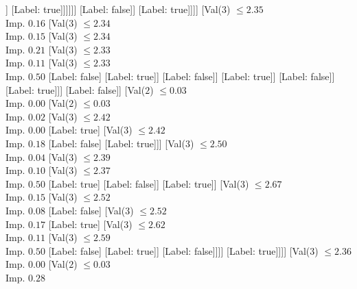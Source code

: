\documentclass[margin=10pt]{standalone}
\begin{document}
\begin{forest}
																										]
																									[Label: true]]]]]]
																				[Label: false]]
																			[Label: true]]]]
																[Val($3$) $ \leq 2.35$ \\ Imp. $0.16$
																	[Val($3$) $ \leq 2.34$ \\ Imp. $0.15$
																		[Val($3$) $ \leq 2.34$ \\ Imp. $0.21$
																			[Val($3$) $ \leq 2.33$ \\ Imp. $0.11$
																				[Val($3$) $ \leq 2.33$ \\ Imp. $0.50$
																					[Label: false]
																					[Label: true]]
																				[Label: false]]
																			[Label: true]]
																		[Label: false]]
																	[Label: true]]]
															[Label: false]]
														[Val($2$) $ \leq 0.03$ \\ Imp. $0.00$
															[Val($2$) $ \leq 0.03$ \\ Imp. $0.02$
																[Val($3$) $ \leq 2.42$ \\ Imp. $0.00$
																	[Label: true]
																	[Val($3$) $ \leq 2.42$ \\ Imp. $0.18$
																		[Label: false]
																		[Label: true]]]
																[Val($3$) $ \leq 2.50$ \\ Imp. $0.04$
																	[Val($3$) $ \leq 2.39$ \\ Imp. $0.10$
																		[Val($3$) $ \leq 2.37$ \\ Imp. $0.50$
																			[Label: true]
																			[Label: false]]
																		[Label: true]]
																	[Val($3$) $ \leq 2.67$ \\ Imp. $0.15$
																		[Val($3$) $ \leq 2.52$ \\ Imp. $0.08$
																			[Label: false]
																			[Val($3$) $ \leq 2.52$ \\ Imp. $0.17$
																				[Label: true]
																				[Val($3$) $ \leq 2.62$ \\ Imp. $0.11$
																					[Val($3$) $ \leq 2.59$ \\ Imp. $0.50$
																						[Label: false]
																						[Label: true]]
																					[Label: false]]]]
																		[Label: true]]]]
															[Val($3$) $ \leq 2.36$ \\ Imp. $0.00$
																[Val($2$) $ \leq 0.03$ \\ Imp. $0.28$

\end{forest}
\end{document}

